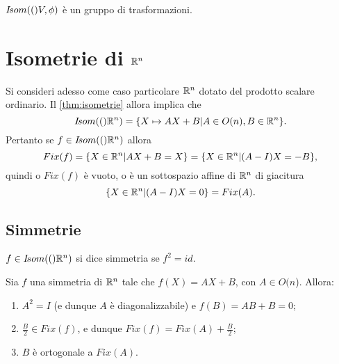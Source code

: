 \documentclass[a4paper,12pt]{article}
\newcommand{\Got}[1]{#1}
\newcommand{\got}[1]{{#1}}
\begin{document}
 \begin{corollary}
\Got{}$\got{\Isom(V,\phi)}$ \Got{è un gruppo di trasformazioni.}
 \end{corollary}
 
	\section{Isometrie di $\mathbb R^n$}
 
 \Got{Si consideri adesso come caso particolare} $\got{\R^n}$ \Got{dotato del prodotto scalare ordinario.
 Il \cref{thm:isometrie} allora implica che} $$\got{\Isom(\R^n)=\{X\mapsto AX+B|A\in O(n),B\in \R^n\}}.$$
 \Got{Pertanto se} $\got{f\in \Isom(\R^n)}$ \Got{allora} $$\got{Fix(f)=\{X\in \R^n|AX+B=X\}=\{X\in \R^n|(A-I)X=-B\}},$$
 \Got{quindi o} $\got{Fix(f)}$ \Got{è vuoto, o è un sottospazio affine di} $\got{\R^n}$ \Got{di giacitura}
 $$\got{\{X\in \R^n|(A-I)X=0\}=Fix(A).}$$
 
	\subsection{Simmetrie}
 
 $\got{f\in \Isom(\R^n)}$ \Got{si dice simmetria se} $\got{f^2=id}$.
 
 \begin{proposition}
 \Got{Sia} $\got{f}$ \Got{una simmetria di} $\got{\R^n}$ \Got{tale che} $\got{f(X)=AX+B}$, \Got{con} $\got{A\in O(n}$).
 \Got{Allora:}
 \begin{enumerate}[label=\bf\Roman*)]
	\item $\got{A^2=I}$ \Got{(e dunque} $\got{A}$ \Got{è diagonalizzabile) e} $\got{f(B)=AB+B=0}$;
	\item $\got{\frac{B}{2}\in Fix(f)}$, \Got{e dunque} $\got{Fix(f)=Fix(A)+\frac{B}{2}}$;
	\item $\got{B}$ \Got{è ortogonale a} $\got{Fix(A)}$.
 \end{enumerate}
 \end{proposition}
 
\end{document}
